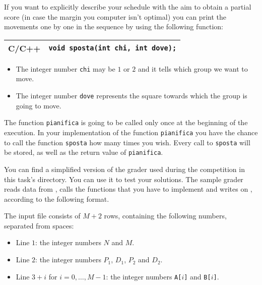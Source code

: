 \medskip

If you want to explicitly describe your schedule with the aim to obtain a partial score (in case the margin you computer isn't optimal) you can print the movements one by one in the sequence by using the following function:

\begin{center}\begin{tabularx}{\textwidth}{|c|X|}
\hline
C/C++  & \verb|void sposta(int chi, int dove);|\\
\hline
\end{tabularx}\end{center}

\begin{itemize}[nolistsep]
  \item The integer number \texttt{chi} may be $1$ or $2$ and it tells which group we want to move.
  \item The integer number \texttt{dove} represents the square towards which the group is going to move.
\end{itemize}

The function \texttt{pianifica} is going to be called only once at the beginning of the execution.
In your implementation of the function \texttt{pianifica} you have the chance to call the function \texttt{sposta} how many times you wish.
Every call to \texttt{sposta} will be stored, as well as the return value of \texttt{pianifica}.



\Grader
You can find a simplified version of the grader used during the competition in this task's directory. You can use it to test your solutions. The sample grader reads data from , calls the functions that you have to implement and writes on \outputfile{}, according to the following format.

The input file consists of $M+2$ rows, containing the following numbers, separated from spaces:
\begin{itemize}[nolistsep,itemsep=2mm]
\item Line $1$: the integer numbers $N$ and $M$.
\item Line $2$: the integer numbers $P_1$, $D_1$, $P_2$ and $D_2$.
\item Line $3+i$ for $i = 0, \ldots, M-1$: the integer numbers \texttt{A[$i$]} and \texttt{B[$i$]}.
\end{itemize}

